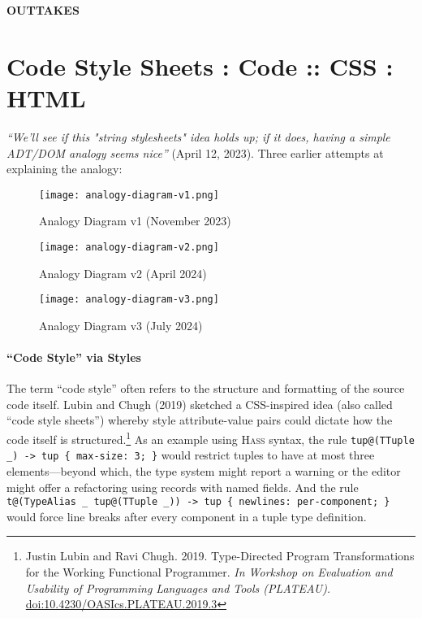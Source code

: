 \documentclass[acmsmall, screen]{acmart}
\newcommand{\parahead}[1]
  {\paragraph{\textbf{#1}}}
\newcommand{\hass}
{\textsc{Hass}}
\begin{document}
\clearpage
\thispagestyle{empty}
\mbox{}

\vspace{2.50in}
{\noindent\hfill\Huge\textbf{OUTTAKES}\hfill}

\clearpage
\section{Code Style Sheets : Code :: CSS : HTML} 

\emph{``We'll see if this "string stylesheets" idea holds up; if it does, having a simple ADT/DOM analogy seems nice''} (April 12, 2023).
Three earlier attempts at explaining the analogy:



\begin{figure}[h] \texttt{[image: analogy-diagram-v1.png]}
\caption{Analogy Diagram v1 (November 2023)}
\label{fig:architecture-v1}
\end{figure}
 \begin{figure}[h]




\texttt{[image: analogy-diagram-v2.png]}
  \caption{Analogy Diagram v2 (April 2024)}
\label{fig:architecture-v2}
\end{figure}
 \begin{figure}[h]




\texttt{[image: analogy-diagram-v3.png]}
  \caption{Analogy Diagram v3 (July 2024)}
\label{fig:architecture-v3}
\end{figure}
 


 
\clearpage
\parahead{``Code Style'' via Styles}

The term ``code style'' often refers to the structure and formatting of the source code itself.
Lubin and Chugh (2019) sketched a CSS-inspired idea (also called ``code style sheets'') whereby style attribute-value pairs could dictate how the code itself is structured.\footnote{Justin Lubin and Ravi Chugh. 2019.
Type-Directed Program Transformations for the Working Functional Programmer.
\emph{In Workshop on Evaluation and Usability of Programming Languages and Tools (PLATEAU).}
\href{https://doi.org/10.4230/OASIcs.PLATEAU.2019.3}{doi:10.4230/OASIcs.PLATEAU.2019.3}
}
As an example using \hass{} syntax, the rule \verb+tup@(TTuple _) -> tup { max-size: 3; }+ would restrict tuples to have at most three elements---beyond which, the type system might report a warning or the editor might offer a refactoring using records with named fields.
And the rule \verb+t@(TypeAlias _ tup@(TTuple _)) -> tup { newlines: per-component; }+ would force line breaks after every component in a tuple type definition.
\end{document}
